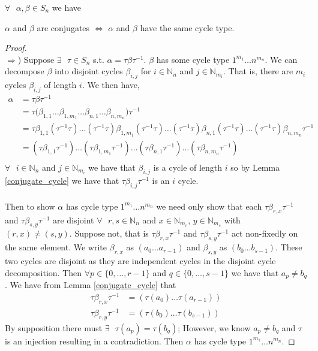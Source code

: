 \begin{theorem}
  \label{conjugate_cycle_type}
  $\forall\text{ }\alpha, \beta \in S_n$ we have
  \begin{center}
    $\alpha$ and $\beta$ are conjugates $\iff$ $\alpha$ and $\beta$
    have the same cycle type.
  \end{center}
\end{theorem}
\begin{proof}
\text{}\\$\Rightarrow$) Suppose $\exists\text{ }\tau\in S_n$ s.t.
$\alpha = \tau\beta\tau^{-1}$. $\beta$ has some cycle type
$1^{m_1}\dots n^{m_n}$. We can decompose
$\beta$ into disjoint cycles $\beta_{i,j}$ for $i\in\mathbb{N}_n$ and $j\in\mathbb{N}_{m_i}$. That is, there are $m_i$ cycles $\beta_{i,j}$ of length $i$. We then have,
\begin{align*}
  \alpha & = \tau\beta\tau^{-1}
  \\
  & = \tau\bigl(\beta_{1,1}\dots\beta_{1,m_1}\dots\beta_{n,1}\dots\beta_{n,m_n}\bigr)\tau^{-1}  \\
  & = \tau\beta_{1,1}(\tau^{-1}\tau)\dots(\tau^{-1}\tau)\beta_{1,m_1}(\tau^{-1}\tau)\dots(\tau^{-1}\tau)\beta_{n,1}(\tau^{-1}\tau)\dots(\tau^{-1}\tau)\beta_{n,m_n}\tau^{-1}  \\
    & = (\tau\beta_{1,1}\tau^{-1})\dots(\tau\beta_{1,m_1}\tau^{-1})\dots(\tau\beta_{n,1}\tau^{-1})\dots(\tau\beta_{n,m_n}\tau^{-1})  \\
\end{align*}
$\forall\text{ }i \in \mathbb{N}_n$ and $j \in \mathbb{N}_{m_i}$ we
have that $\beta_{i,j}$ is a cycle of length $i$ so
by Lemma \ref{conjugate_cycle} we have that $\tau\beta_{i, j}\tau^{-1}$ is an $i$ cycle.
\\\\Then to show $\alpha$ has cycle type
$1^{m_1}\dots n^{m_n}$ we need only show that each
$\tau\beta_{r, x}\tau^{-1}$ and $\tau\beta_{s,
y}\tau^{-1}$ are disjoint $\forall\text{ }r,s\in\mathbb{N}_n$ and
$x\in\mathbb{N}_{m_r}$, $y\in\mathbb{N}_{m_s}$ with $(r,x) \ne (s,y)$. Suppose not, that is
$\tau\beta_{r, x}\tau^{-1}$ and $\tau\beta_{s,
y}\tau^{-1}$ act non-fixedly on the same element. We write
$\beta_{r,x}$ as $(a_0\dots a_{r-1})$ and
$\beta_{s,y}$ as $(b_0\dots b_{s-1})$. These two
cycles are disjoint as they are independent cycles in the disjoint
cycle decomposition. Then $\forall\text{
}p\in\{0,\dots,r-1\}$ and $q\in\{0,\dots,s-1\}$ we
have that $a_p \ne b_q$.
We have from Lemma \ref{conjugate_cycle} that
\begin{align*}
  \tau\beta_{r, x}\tau^{-1} & = (\tau(a_0)\dots\tau(a_{r-1})) \\
  \tau\beta_{r, y}\tau^{-1} & = (\tau(b_0)\dots\tau(b_{s-1}))
\end{align*}
By supposition there must $\exists\text{ }\tau(a_p) = \tau(b_q)$;
However, we know $a_p \ne b_q$ and $\tau$ is an injection resulting in a
contradiction. Then $\alpha$ has cycle type
$1^{m_1}\dots n^{m_n}$.


\end{proof}
